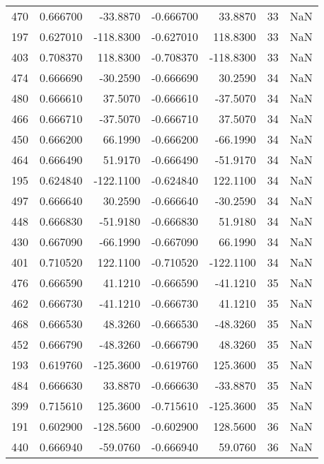 \begin{tabular}{rrrrrrr}
 470 &    0.666700 &  -33.8870 &   -0.666700 &     33.8870 &          33 & NaN \\
 197 &    0.627010 & -118.8300 &   -0.627010 &    118.8300 &          33 & NaN \\
 403 &    0.708370 &  118.8300 &   -0.708370 &   -118.8300 &          33 & NaN \\
 474 &    0.666690 &  -30.2590 &   -0.666690 &     30.2590 &          34 & NaN \\
 480 &    0.666610 &   37.5070 &   -0.666610 &    -37.5070 &          34 & NaN \\
 466 &    0.666710 &  -37.5070 &   -0.666710 &     37.5070 &          34 & NaN \\
 450 &    0.666200 &   66.1990 &   -0.666200 &    -66.1990 &          34 & NaN \\
 464 &    0.666490 &   51.9170 &   -0.666490 &    -51.9170 &          34 & NaN \\
 195 &    0.624840 & -122.1100 &   -0.624840 &    122.1100 &          34 & NaN \\
 497 &    0.666640 &   30.2590 &   -0.666640 &    -30.2590 &          34 & NaN \\
 448 &    0.666830 &  -51.9180 &   -0.666830 &     51.9180 &          34 & NaN \\
 430 &    0.667090 &  -66.1990 &   -0.667090 &     66.1990 &          34 & NaN \\
 401 &    0.710520 &  122.1100 &   -0.710520 &   -122.1100 &          34 & NaN \\
 476 &    0.666590 &   41.1210 &   -0.666590 &    -41.1210 &          35 & NaN \\
 462 &    0.666730 &  -41.1210 &   -0.666730 &     41.1210 &          35 & NaN \\
 468 &    0.666530 &   48.3260 &   -0.666530 &    -48.3260 &          35 & NaN \\
 452 &    0.666790 &  -48.3260 &   -0.666790 &     48.3260 &          35 & NaN \\
 193 &    0.619760 & -125.3600 &   -0.619760 &    125.3600 &          35 & NaN \\
 484 &    0.666630 &   33.8870 &   -0.666630 &    -33.8870 &          35 & NaN \\
 399 &    0.715610 &  125.3600 &   -0.715610 &   -125.3600 &          35 & NaN \\
 191 &    0.602900 & -128.5600 &   -0.602900 &    128.5600 &          36 & NaN \\
 440 &    0.666940 &  -59.0760 &   -0.666940 &     59.0760 &          36 & NaN \\

\end{tabular}
